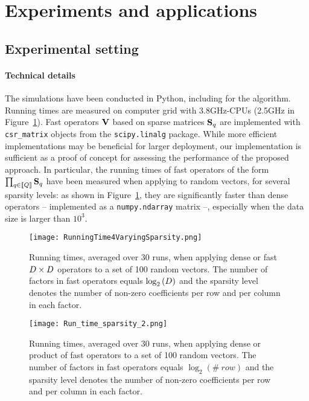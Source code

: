 \section{Experiments and applications}
\label{sec:uses}
\subsection{Experimental setting}

\paragraph{Technical details}
The simulations have been conducted in Python, including for the \palm algorithm.
Running times are measured on computer grid with 3.8GHz-CPUs (2.5GHz in Figure~\ref{fig:time_csr}).
Fast operators ${\mathbf{V}}$ based on sparse matrices ${\mathbf{S}}_q$ are implemented with \texttt{csr\_matrix} objects from the \texttt{scipy.linalg} package. 
While more efficient implementations may be beneficial for larger deployment, our implementation is sufficient as a proof of concept for assessing the performance of the proposed approach. 
In particular, the running times of fast operators of the form $\prod_{q\in\left \llbracket Q\right \rrbracket}{{\mathbf{S}}_q}$ have been measured when applying to random vectors, for several sparsity levels: 
as shown in Figure~\ref{fig:time_csr}, they are significantly faster than dense operators -- implemented as a \texttt{numpy.ndarray} matrix --, especially when the data size is larger than $10^3$.


\begin{figure}[tbh]
\centering
\texttt{[image: RunningTime4VaryingSparsity.png]}
\caption{Running times, averaged over 30 runs, when applying dense or fast $D \times D$ operators to a set of 100 random vectors. The number of factors in fast operators equals $\log_2\left (D\right )$ and the sparsity level denotes the number of non-zero coefficients per row and per column in each factor. }
\label{fig:time_csr}
\end{figure}

\begin{figure}[tbh]
\centering
\texttt{[image: Run\_time\_sparsity\_2.png]}
\caption{Running times, averaged over 30 runs, when applying dense or product of fast operators to a set of 100 random vectors. The number of factors in fast operators equals $\log_2\left (\#~row\right )$ and the sparsity level denotes the number of non-zero coefficients per row and per column in each factor.}
\label{fig:time_csr_fixed_row_size}
\end{figure}


